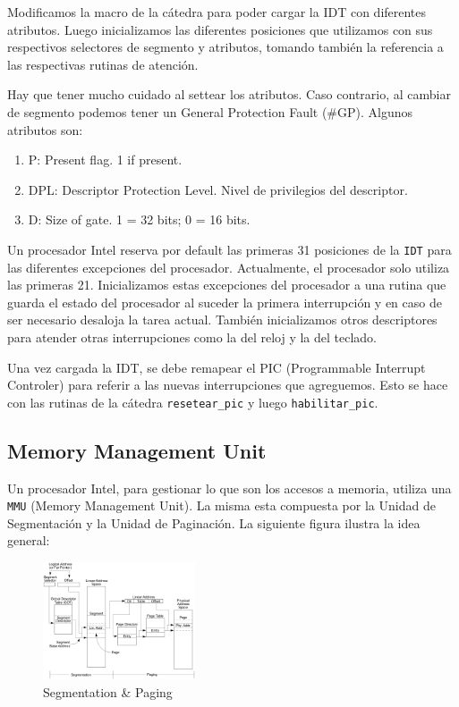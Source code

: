 Modificamos la macro de la cátedra para poder cargar la IDT con diferentes atributos. Luego inicializamos las diferentes posiciones que utilizamos con sus respectivos selectores de segmento y atributos, tomando también la referencia a las respectivas rutinas de atención.

Hay que tener mucho cuidado al settear los atributos. Caso contrario, al cambiar de segmento podemos tener un General Protection Fault (\#GP). Algunos atributos son:

\begin{enumerate}
\item P: Present flag. 1 if present.
\item DPL: Descriptor Protection Level. Nivel de privilegios del descriptor.
\item D: Size of gate. 1 = 32 bits; 0 = 16 bits.
\end{enumerate}

Un procesador Intel reserva por default las primeras 31 posiciones de la \texttt{IDT} para las diferentes excepciones del procesador. Actualmente, el procesador solo utiliza las primeras 21. Inicializamos estas excepciones del procesador a una rutina que guarda el estado del procesador al suceder la primera interrupción y en caso de ser necesario desaloja la tarea actual. También inicializamos otros descriptores para atender otras interrupciones como la del reloj y la del teclado.

Una vez cargada la IDT, se debe remapear el PIC (Programmable Interrupt Controler) para referir a las nuevas interrupciones que agreguemos. Esto se hace con las rutinas de la cátedra \texttt{resetear\_pic} y luego \texttt{habilitar\_pic}.

\pagebreak

\subsection{Memory Management Unit}
Un procesador Intel, para gestionar lo que son los accesos a memoria, utiliza una \texttt{MMU} (Memory Management Unit). La misma esta compuesta por la Unidad de Segmentación y la Unidad de Paginación. La siguiente figura ilustra la idea general:

\begin{figure}[H]
  \centering
    \includegraphics[width=0.4\textwidth]{images/memory_management}
  \caption{Segmentation \& Paging}
\end{figure}


